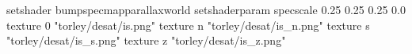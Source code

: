 setshader bumpspecmapparallaxworld
setshaderparam specscale 0.25 0.25 0.25 0.0
texture 0 "torley/desat/is.png"
texture n "torley/desat/is_n.png"
texture s "torley/desat/is_s.png"
texture z "torley/desat/is_z.png"


